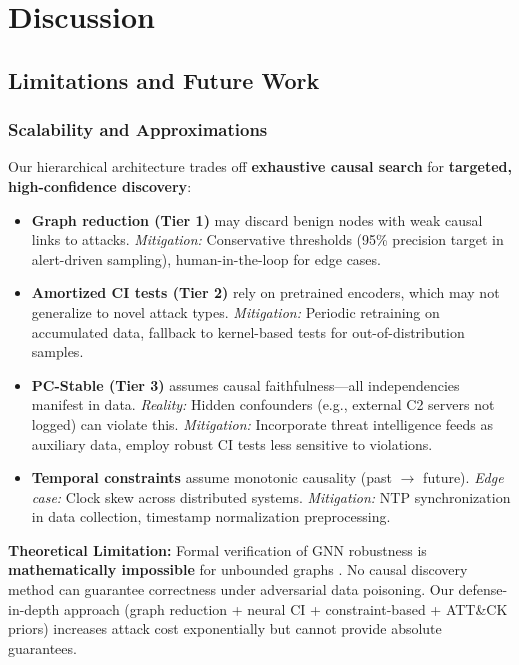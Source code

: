 \documentclass[conference]{IEEEtran}
\begin{document}
\section{Discussion}

\subsection{Limitations and Future Work}

\subsubsection{Scalability and Approximations}

Our hierarchical architecture trades off \textbf{exhaustive causal search} for \textbf{targeted, high-confidence discovery}:

\begin{itemize}
    \item \textbf{Graph reduction (Tier 1)} may discard benign nodes with weak causal links to attacks. \textit{Mitigation:} Conservative thresholds (95\% precision target in alert-driven sampling), human-in-the-loop for edge cases.
    
    \item \textbf{Amortized CI tests (Tier 2)} rely on pretrained encoders, which may not generalize to novel attack types. \textit{Mitigation:} Periodic retraining on accumulated data, fallback to kernel-based tests for out-of-distribution samples.
    
    \item \textbf{PC-Stable (Tier 3)} assumes causal faithfulness—all independencies manifest in data. \textit{Reality:} Hidden confounders (e.g., external C2 servers not logged) can violate this. \textit{Mitigation:} Incorporate threat intelligence feeds as auxiliary data, employ robust CI tests less sensitive to violations.
    
    \item \textbf{Temporal constraints} assume monotonic causality (past $\rightarrow$ future). \textit{Edge case:} Clock skew across distributed systems. \textit{Mitigation:} NTP synchronization in data collection, timestamp normalization preprocessing.
\end{itemize}

\textbf{Theoretical Limitation:} Formal verification of GNN robustness is \textbf{mathematically impossible} for unbounded graphs \cite{gnn_verification}. No causal discovery method can guarantee correctness under adversarial data poisoning. Our defense-in-depth approach (graph reduction + neural CI + constraint-based + ATT\&CK priors) increases attack cost exponentially but cannot provide absolute guarantees.
\end{document}
